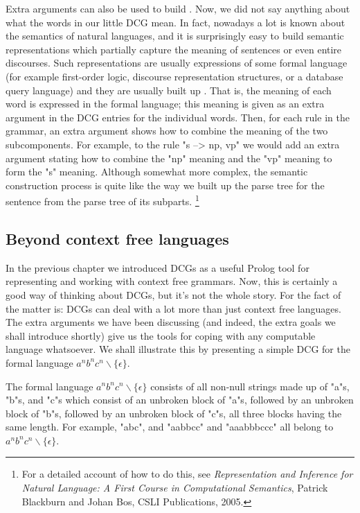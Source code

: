 Extra arguments can also be used to build .  Now, we did not say anything about what the words
in our little DCG mean.  In fact, nowadays a lot is known about the
semantics of natural languages, and it is surprisingly easy to build
semantic representations which partially capture the meaning of
sentences or even entire discourses.  Such representations are usually
expressions of some formal language (for example first-order logic,
discourse representation structures, or a database query language) and
they are usually built up .  That is, the
meaning of each word is expressed in the formal language; this meaning
is given as an extra argument in the DCG entries for the individual
words.  Then, for each rule in the grammar, an extra argument shows
how to combine the meaning of the two subcomponents.  For example, to
the rule "s --> np, vp" we would add an extra argument stating how to
combine the "np" meaning and the "vp" meaning to form the "s" meaning.
Although somewhat more complex, the semantic construction process is
quite like the way we built up the parse tree for the sentence from
the parse tree of its subparts.%
\footnote{For a detailed account of how to do this, see
\textit{Representation and Inference for Natural Language: A First
Course in Computational Semantics}, Patrick Blackburn and Johan Bos,
CSLI Publications, 2005.}


\subsection*{Beyond context free languages}\label{SUBSEC.L8.NON.CONTEXT.FREE}



In the previous chapter we introduced DCGs as a useful Prolog tool for
representing and working with context free grammars. Now, this is
certainly a good way of thinking about DCGs, but it's not the whole
story. For the fact of the matter is: DCGs can deal with a lot more
than just context free languages. The extra arguments we have been
discussing (and indeed, the extra goals we shall introduce shortly)
give us the tools for coping with any computable language
whatsoever. We shall illustrate this by presenting a simple DCG for the
formal language $a^nb^nc^n \backslash \{ \epsilon \}$.

The formal language $a^nb^nc^n \backslash \{ \epsilon \}$  consists
of all non-null strings made up of "a"s, "b"s, and "c"s which consist
of an unbroken block of "a"s, followed by an unbroken block of "b"s,
followed by an unbroken block of "c"s, all three blocks having the
same length. For example, "abc", and "aabbcc" and "aaabbbccc" all
belong to
$a^nb^nc^n \backslash \{ \epsilon \}$.


